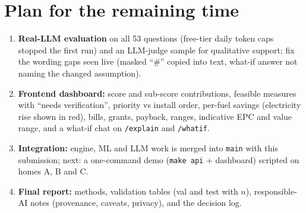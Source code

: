 \documentclass[10pt,a4paper]{article}
\begin{document}
\section{Plan for the remaining time}
\begin{enumerate}
\item \textbf{Real-LLM evaluation} on all 53 questions (free-tier daily token caps stopped the first run) and an LLM-judge
sample for qualitative support; fix the wording gaps seen live (masked ``\#'' copied into text, what-if answer not naming
the changed assumption).
\item \textbf{Frontend dashboard:} score and sub-score contributions, feasible measures with ``needs verification'',
priority vs install order, per-fuel savings (electricity rise shown in red), bills, grants, payback, ranges,
indicative EPC and value range, and a what-if chat on \texttt{/explain} and \texttt{/whatif}.
\item \textbf{Integration:} engine, ML and LLM work is merged into \texttt{main} with this submission; next: a
one-command demo (\texttt{make api} + dashboard) scripted on homes A, B and C.
\item \textbf{Final report:} methods, validation tables (val and test with $n$), responsible-AI notes (provenance,
caveats, privacy), and the decision log.
\end{enumerate}
\end{document}
